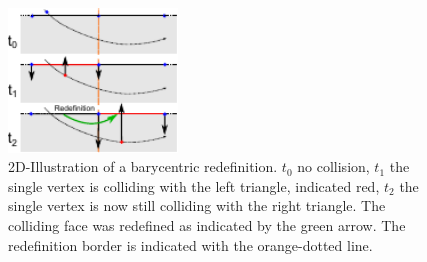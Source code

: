 \begin{figure}[h] 
  \centering
     \includegraphics[width=0.40\textwidth]{pics/pdf/slidingVertexArtifactImplausibleForcesRedef.pdf}
  \caption[2D-Illustration of a barycentric redefinition.   Dots indicate the vertices, the red ones are colliding.]{2D-Illustration of a barycentric redefinition.   $t_0$ no collision, $t_1$ the single vertex is colliding with the left triangle, indicated red, $t_2$ the single vertex is now still colliding with the right triangle. The colliding face was redefined as indicated by the green arrow. The redefinition border is indicated with the orange-dotted line.}
  \label{fig::slidingVertexArtifactImplausibleForcesRedef}
\end{figure}


